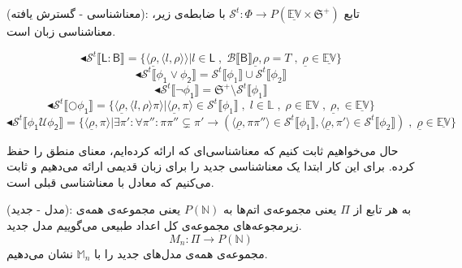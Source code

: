 \begin{defn}
	(معناشناسی - گسترش یافته): تابع 
	$\mathcal{S}^t : \Phi \rightarrow \mathit{P}(\mathbb{\underline{EV}}\times\mathfrak{S}^{+})$
	با ضابطه‌ی زیر، معناشناسی زبان  است.
	
	$$\blacktriangleleft \mathcal{S}^t \llbracket \mathsf{L:B} \rrbracket = 
	\{ \langle \underline{\rho} , \langle l , \rho \rangle\rangle | l \in \mathsf{L} \; , \; \mathcal{B}\llbracket \mathsf{B} \rrbracket \underline{\rho}, \rho=\mathit{T} \; , \; \underline{\rho}\in \mathbb{\underline{EV}}\}$$
	$$\blacktriangleleft \mathcal{S}^t \llbracket \mathsf{\phi_1 \lor \phi_2} \rrbracket =
	\mathcal{S}^t \llbracket \phi_1 \rrbracket \cup \mathcal{S}^t \llbracket \phi_2 \rrbracket
	$$
	$$\blacktriangleleft \mathcal{S}^t \llbracket \mathsf{\neg \phi_1} \rrbracket =
	\mathfrak{S}^{+} \setminus \mathcal{S}^t \llbracket \phi_1 \rrbracket
	$$
	$$\blacktriangleleft \mathcal{S}^t \llbracket \mathsf{\bigcirc \phi_1} \rrbracket =
	\{ \langle \underline{\rho} , \langle l , \rho \rangle \pi \rangle | \langle \underline{\rho},\pi \rangle \in \mathcal{S}^t \llbracket \phi_1 \rrbracket \; , \; l \in \mathbb{L} \; , \; \rho \in \mathbb{EV} \; , \;\underline{\rho},\in \mathbb{\underline{EV}} \}
	$$
	$$\blacktriangleleft \mathcal{S}^t \llbracket \mathsf{\phi_1 \mathcal{U} \phi_2} \rrbracket =
	\{ \langle \underline{\rho} , \pi \rangle | \exists \pi': \forall \pi'': \pi \pi'' \subsetneq \pi' \rightarrow (\langle \underline{\rho}, \pi \pi'' \rangle \in \mathcal{S}^t \llbracket \phi_1 \rrbracket,\langle \underline{\rho}, \pi' \rangle \in \mathcal{S}^t \llbracket \phi_2 \rrbracket) \; , \;\underline{\rho} \in \mathbb{\underline{EV}} \}
	$$
	
	
\end{defn}

حال می‌خواهیم ثابت کنیم که معناشناسی‌ای که ارائه کرده‌ایم، معنای منطق  را حفظ کرده. 
برای این کار ابتدا یک معناشناسی جدید را برای زبان  قدیمی ارائه می‌دهیم و ثابت می‌کنیم که معادل با معناشناسی قبلی است. 

\begin{defn}
	(مدل - جدید): به هر تابع از $\Pi$ یعنی مجموعه‌ی اتم‌ها به $\mathit{P(\mathbb{N})}$ یعنی مجموعه‌ی همه‌ی زیرمجوعه‌های مجموعه‌ی کل اعداد طبیعی می‌گوییم مدل جدید.
	$$M_n:\Pi \rightarrow \mathit{P(\mathbb{N})}$$
	مجموعه‌ی همه‌ی مدل‌های جدید را با 
	$\mathbb{M}_n$
	نشان می‌دهیم.
\end{defn}

